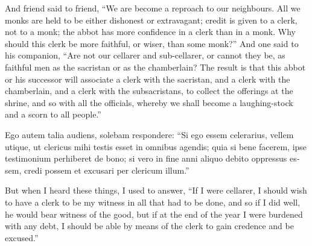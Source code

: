 \documentclass{book}
\begin{document}
\begin{paracol}{2}
And friend said to friend, ``We are become a reproach to our neighbours. All we monks are held to be either dishonest or extravagant; credit is given to a clerk, not to a monk; the abbot has more confidence in a clerk than in a monk. Why should this clerk be more faithful, or wiser, than some monk?'' And one said to his companion, ``Are not our cellarer and sub-cellarer, or cannot they be, as faithful men as the sacristan or as the chamberlain? The result is that this abbot or his successor will associate a clerk with the sacristan, and a clerk with the chamberlain, and a clerk with the subsacristans, to collect the offerings at the shrine, and so with all the officials, whereby we shall become a laughing-stock and a scorn to all people.''

\switchcolumn*

\begin{otherlanguage}{latin}
Ego autem talia audiens, solebam respondere: ``Si ego essem celerarius, vellem utique, ut clericus mihi testis esset in omnibus agendis; quia si bene facerem, ipse testimonium perhiberet de bono; si vero in fine anni aliquo debito oppressus essem, credi possem et excusari per clericum illum.''
\end{otherlanguage}

\switchcolumn

But when I heard these things, I used to answer, ``If I were cellarer, I should wish to have a clerk to be my witness in all that had to be done, and so if I did well, he would bear witness of the good, but if at the end of the year I were burdened with any debt, I should be able by means of the clerk to gain credence and be excused.''

\switchcolumn*


\end{paracol}
\end{document}
